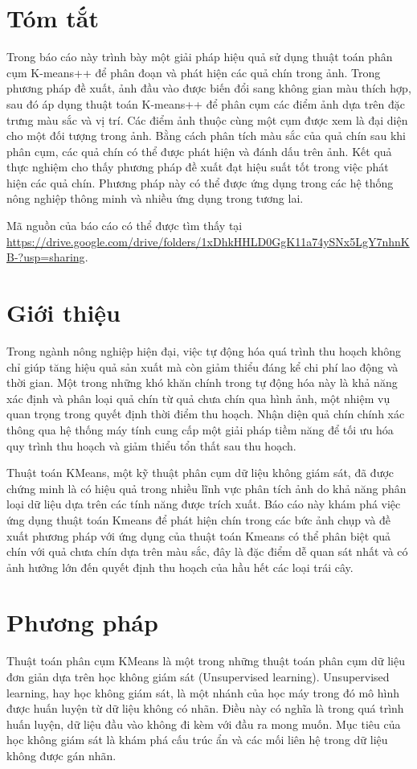\documentclass[a4paper]{article}
\begin{document}
\section*{Tóm tắt}
Trong báo cáo này trình bày một giải pháp hiệu quả sử dụng thuật toán phân cụm K-means++ để phân đoạn và phát hiện các quả chín trong ảnh. Trong phương pháp đề xuất, ảnh đầu vào được biến đổi sang không gian màu thích hợp, sau đó áp dụng thuật toán K-means++ để phân cụm các điểm ảnh dựa trên đặc trưng màu sắc và vị trí. Các điểm ảnh thuộc cùng một cụm được xem là đại diện cho một đối tượng trong ảnh. Bằng cách phân tích màu sắc của quả chín sau khi phân cụm, các quả chín có thể được phát hiện và đánh dấu trên ảnh. Kết quả thực nghiệm cho thấy phương pháp đề xuất đạt hiệu suất tốt trong việc phát hiện các quả chín. Phương pháp này có thể được ứng dụng trong các hệ thống nông nghiệp thông minh và nhiều ứng dụng trong tương lai.

Mã nguồn của báo cáo có thể được tìm thấy tại \url{https://drive.google.com/drive/folders/1xDhkHHLD0GgK11a74ySNx5LgY7nhnKB-?usp=sharing}.

\section{Giới thiệu}
Trong ngành nông nghiệp hiện đại, việc tự động hóa quá trình thu hoạch không chỉ giúp tăng hiệu quả sản xuất mà còn giảm thiểu đáng kể chi phí lao động và thời gian. Một trong những khó khăn chính trong tự động hóa này là khả năng xác định và phân loại quả chín từ quả chưa chín qua hình ảnh, một nhiệm vụ quan trọng trong quyết định thời điểm thu hoạch. Nhận diện quả chín chính xác thông qua hệ thống máy tính cung cấp một giải pháp tiềm năng để tối ưu hóa quy trình thu hoạch và giảm thiểu tổn thất sau thu hoạch.

Thuật toán KMeans, một kỹ thuật phân cụm dữ liệu không giám sát, đã được chứng minh là có hiệu quả trong nhiều lĩnh vực phân tích ảnh do khả năng phân loại dữ liệu dựa trên các tính năng được trích xuất. Báo cáo này khám phá việc ứng dụng thuật toán Kmeans để phát hiện chín trong các bức ảnh chụp và đề xuất phương pháp với ứng dụng của thuật toán Kmeans có thể phân biệt quả chín với quả chưa chín dựa trên màu sắc, đây là đặc điểm dễ quan sát nhất và có ảnh hưởng lớn đến quyết định thu hoạch của hầu hết các loại trái cây.

\section{Phương pháp}
Thuật toán phân cụm KMeans là một trong những thuật toán phân cụm dữ liệu đơn giản dựa trên học không giám sát (Unsupervised learning). Unsupervised learning, hay học không giám sát, là một nhánh của học máy trong đó mô hình được huấn luyện từ dữ liệu không có nhãn. Điều này có nghĩa là trong quá trình huấn luyện, dữ liệu đầu vào không đi kèm với đầu ra mong muốn. Mục tiêu của học không giám sát là khám phá cấu trúc ẩn và các mối liên hệ trong dữ liệu không được gán nhãn.
\end{document}
